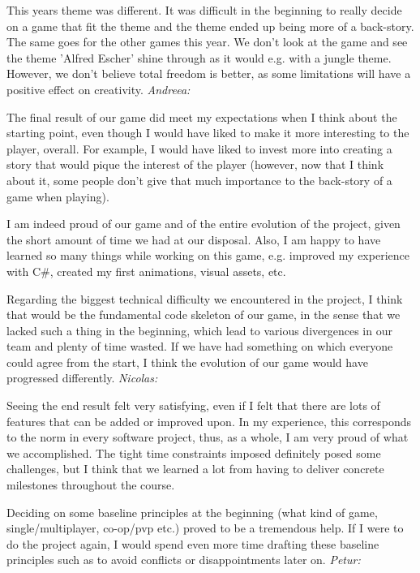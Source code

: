 This years theme was different. It was difficult in the beginning to really decide on a game that fit the theme and the theme ended up being more of a back-story. The same goes for the other games this year. We don't look at the game and see the theme 'Alfred Escher' shine through as it would e.g. with a jungle theme. However, we don't believe total freedom is better, as some limitations will have a positive effect on creativity.
\newline\newline
\textit{Andreea:}

The final result of our game did meet my expectations when I think about the starting point, even though I would have liked to make it more interesting to the player, overall. For example, I would have liked to invest more into creating a story that would pique the interest of the player (however, now that I think about it, some people don’t give that much importance to the back-story of a game when playing). 

I am indeed proud of our game and of the entire evolution of the project, given the short amount of time we had at our disposal. Also, I am happy to have learned so many things while working on this game, e.g. improved my experience with C\#, created my first animations, visual assets, etc. 

Regarding the biggest technical difficulty we encountered in the project, I think that would be the fundamental code skeleton of our game, in the sense that we lacked such a thing in the beginning, which lead to various divergences in our team and plenty of time wasted. If we have had something on which everyone could agree from the start, I think the evolution of our game would have progressed differently. 
\newline\newline
\textit{Nicolas:}

Seeing the end result felt very satisfying, even if I felt that there are lots of features that can be added or improved upon. In my experience, this corresponds to the norm in every software project, thus, as a whole, I am very proud of what we accomplished. The tight time constraints imposed definitely posed some challenges, but I think that we learned a lot from having to deliver concrete milestones throughout the course.

Deciding on some baseline principles at the beginning (what kind of game, single/multiplayer, co-op/pvp etc.) proved to be a tremendous help. If I were to do the project again, I would spend even more time drafting these baseline principles such as to avoid conflicts or disappointments later on.
\newline\newline
\textit{Petur:}

